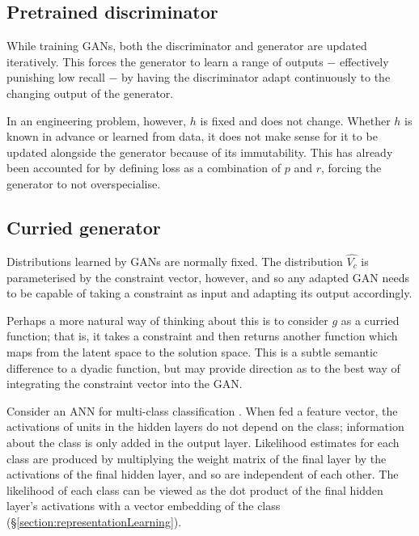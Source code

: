 \documentclass[../../main.tex]{subfiles}
\begin{document}
\subsection{Pretrained discriminator} \label{subsection:pretrainedDiscriminator}

While training GANs, both the discriminator and generator are updated iteratively.
This forces the generator to learn a range of outputs $-$ effectively punishing low recall $-$ by having the discriminator adapt continuously to the changing output of the generator.

In an engineering problem, however, $h$ is fixed and does not change.
Whether $h$ is known in advance or learned from data, it does not make sense for it to be updated alongside the generator because of its immutability.
This has already been accounted for by defining loss as a combination of $p$ and $r$, forcing the generator to not overspecialise.

\subsection{Curried generator} \label{subsection:curriedGenerator}

Distributions learned by GANs are normally fixed.
The distribution $\hat{V_c}$ is parameterised by the constraint vector, however, and so any adapted GAN needs to be capable of taking a constraint as input and adapting its output accordingly.

Perhaps a more natural way of thinking about this is to consider $g$ as a curried function; that is, it takes a constraint and then returns another function which maps from the latent space to the solution space.
This is a subtle semantic difference to a dyadic function, but may provide direction as to the best way of integrating the constraint vector into the GAN.

Consider an ANN for multi-class classification \cite{ou07}.
When fed a feature vector, the activations of units in the hidden layers do not depend on the class; information about the class is only added in the output layer.
Likelihood estimates for each class are produced by multiplying the weight matrix of the final layer by the activations of the final hidden layer, and so are independent of each other.
The likelihood of each class can be viewed as the dot product of the final hidden layer's activations with a vector embedding of the class (\S\ref{section:representationLearning}).
\end{document}

